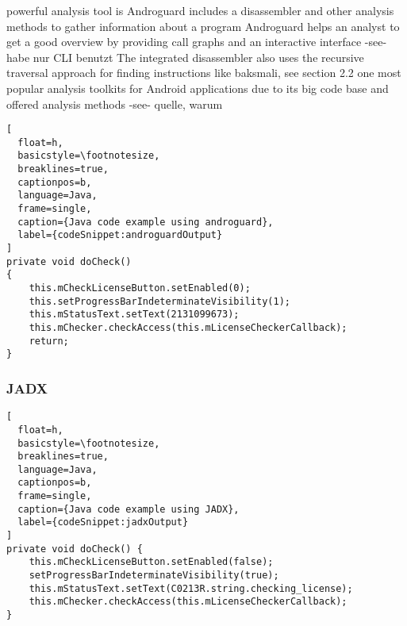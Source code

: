 powerful analysis tool is Androguard\newline
includes a disassembler and other analysis methods to gather information about a program\newline
Androguard helps an analyst to get a good overview by providing call graphs and an interactive interface -see- habe nur CLI benutzt\newline
The integrated disassembler also uses the recursive traversal approach for finding instructions like baksmali, see section 2.2\newline
one most popular analysis toolkits for Android applications due to its big code base and offered analysis methods -see- quelle, warum\newline


\begin{lstlisting}[
  float=h,
  basicstyle=\footnotesize,
  breaklines=true,
  captionpos=b,
  language=Java,
  frame=single,
  caption={Java code example using androguard},
  label={codeSnippet:androguardOutput}
]
private void doCheck()
{
    this.mCheckLicenseButton.setEnabled(0);
    this.setProgressBarIndeterminateVisibility(1);
    this.mStatusText.setText(2131099673);
    this.mChecker.checkAccess(this.mLicenseCheckerCallback);
    return;
}
\end{lstlisting}

\subsubsection{JADX}


\begin{lstlisting}[
  float=h,
  basicstyle=\footnotesize,
  breaklines=true,
  language=Java,
  captionpos=b,
  frame=single,
  caption={Java code example using JADX},
  label={codeSnippet:jadxOutput}
]
private void doCheck() {
    this.mCheckLicenseButton.setEnabled(false);
    setProgressBarIndeterminateVisibility(true);
    this.mStatusText.setText(C0213R.string.checking_license);
    this.mChecker.checkAccess(this.mLicenseCheckerCallback);
}
\end{lstlisting}
